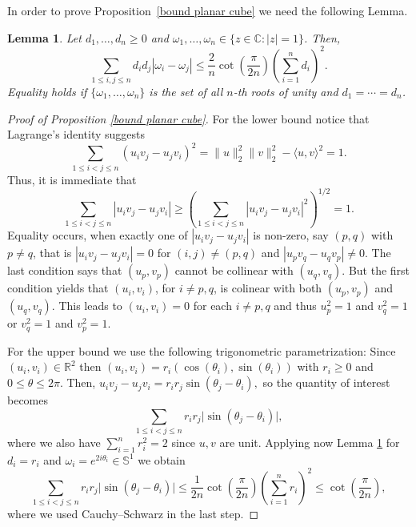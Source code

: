 \documentclass[10pt]{amsart}
\newcommand{\ls}{\leqslant}
\newcommand{\gr}{\geqslant}
\newcommand{\1}{\textbf{1}}
\numberwithin{equation}{section} %
\newtheorem{lemma}[theorem]{Lemma}
\theoremstyle{remark}
\theoremstyle{definition}
\begin{document}
In order to prove Proposition~\ref{bound planar cube} we need the following Lemma.
\begin{lemma}\label{matrix lemma}\cite[Lemma 7]{EinollahzadehNematollahi+2025}
Let $d_1,\ldots,d_n\gr0$ and $\omega_1,\ldots,\omega_n\in \{z\in \mathbb{C}: |z|=1\}$. Then,
\[
\sum_{1\ls i,j \ls n}d_id_j|\omega_i-\omega_j|\ls \frac{2}{n}\cot\left(\frac{\pi}{2n}\right) \left(\sum_{i=1}^nd_i \right)^2.
\]
Equality holds if $\{\omega_1,\ldots,\omega_n\}$  is the set of all $n$-th roots of unity and $d_1=\cdots=d_n$.
\end{lemma}

\begin{proof}[Proof of Proposition \ref{bound planar cube}]
For the lower bound notice that Lagrange's identity suggests 
\begin{equation}\label{Lagrange identity}
\sum_{1\ls i<j\ls n}( u_iv_j-u_jv_i)^2=\|u\|_2^2\|v\|_2^2-\langle u,v \rangle ^2=1.
\end{equation}
Thus, it is immediate that
\[
 \sum_{1\ls i<j\ls n} |u_iv_j-u_jv_i| \gr \left( \sum_{1\ls i<j\ls n} |u_iv_j-u_jv_i|^2 \right)^{1/2}=1.
\]
Equality occurs, when exactly one of $|u_iv_j-u_jv_i|$ is non-zero, say $(p,q)$ with $p\neq q$, that is $|u_iv_j-u_jv_i|=0$ for $(i,j)\neq (p,q)$ and $|u_pv_q-u_qv_p|\neq 0$. The last condition says that $(u_p,v_p)$ cannot be collinear with $(u_q,v_q)$. But the first condition yields that $(u_i,v_i)$, for $i\neq p,q$, is colinear with both $(u_p,v_p)$ and $(u_q,v_q)$. This leads to $(u_i,v_i)=0$ for each $i \neq p,q$ and thus $u_p^2=1$ and $v_q^2=1$ or $v_q^2=1$ and $v_p^2=1$.

For the upper bound we use the following trigonometric parametrization: Since $(u_i,v_i)\in \mathbb{R}^2$  then $(u_i,v_i)=r_i(\cos(\theta_i),\sin(\theta_i))$ with $r_i\gr0$ and $0\ls \theta\ls 2\pi$.  Then, $u_i v_j - u_j v_i = r_i r_j \sin(\theta_j-\theta_i),$ so the quantity of interest becomes
\begin{equation}\label{trigonometric quant}
  \sum_{1\le i<j\le n} r_i r_j \big|\sin(\theta_j-\theta_i)\big|,
\end{equation}
where we also have $\sum_{i=1}^nr_i^2=2$ since $u,v$ are unit. Applying now Lemma \ref{matrix lemma} for $d_i=r_i$ and $\omega_i=e^{2i\theta_i}\in \mathbb{S}^1$ we obtain 
\begin{equation}
   \sum_{1\le i<j\le n} r_i r_j \big|\sin(\theta_j-\theta_i)\big|\ls\frac{1}{2n} \cot\left( \frac{\pi}{2n} \right)\left(\sum_{i=1}^nr_i \right)^2\ls \cot\left( \frac{\pi}{2n} \right),
\end{equation}
where we used Cauchy--Schwarz in the last step. 
\end{proof}
\end{document}
